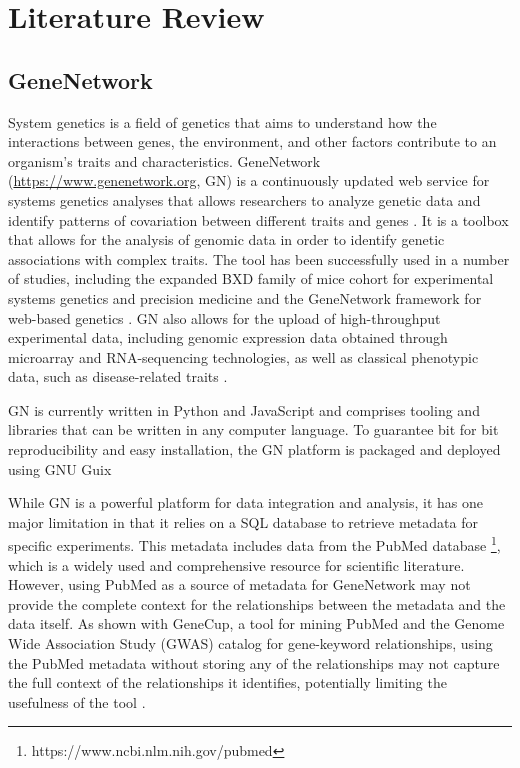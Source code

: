 \chapter{Literature Review}
\section{GeneNetwork}
System genetics is a field of genetics that aims to understand how the interactions between genes, the environment, and other factors contribute to an organism's traits and characteristics.  GeneNetwork (\url{https://www.genenetwork.org}, GN) is a continuously updated web service for systems genetics analyses that allows researchers to analyze genetic data and identify patterns of covariation between different traits and genes \citep{mulligan2017genenetwork}.  It is a toolbox that allows for the analysis of genomic data in order to identify genetic associations with complex traits. The tool has been successfully used in a number of studies, including the expanded BXD family of mice cohort for experimental systems genetics and precision medicine \citep{Ashbrook:2019} and the GeneNetwork framework for web-based genetics \citep{sloan2016genenetwork}.  GN also allows for the upload of high-throughput experimental data, including genomic expression data obtained through microarray and RNA-sequencing technologies, as well as classical phenotypic data, such as disease-related traits \citep{Anderson:2021}.

GN is currently written in Python and JavaScript and comprises tooling and libraries that can be written in any computer language.  To guarantee bit for bit reproducibility and easy installation, the GN platform is packaged and deployed using GNU Guix \citep{sloan2016genenetwork}

While GN is a powerful platform for data integration and analysis, it has one major limitation in that it relies on a SQL database to retrieve metadata for specific experiments.  This metadata includes data from the PubMed database \footnote{https://www.ncbi.nlm.nih.gov/pubmed}, which is a widely used and comprehensive resource for scientific literature.  However, using PubMed  as a source of metadata for GeneNetwork may not provide the complete context for the relationships between the metadata and the data itself.  As shown with GeneCup, a tool for mining PubMed and the Genome Wide Association Study (GWAS) catalog for gene-keyword relationships, using the PubMed metadata without storing any of the relationships may not capture the full context of the relationships it identifies, potentially limiting the usefulness of the tool \citep{gunturkun2022genecup}.

